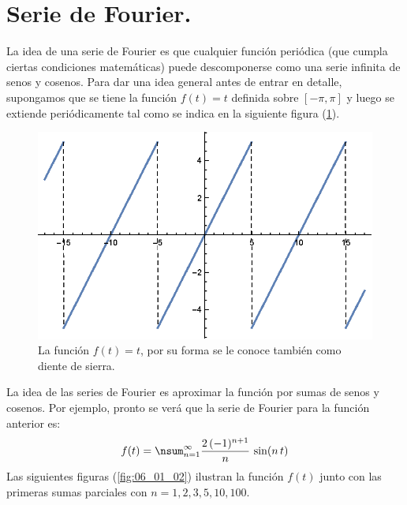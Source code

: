 \section{Serie de Fourier.}

La idea de una serie de Fourier es que cualquier función periódica (que cumpla ciertas condiciones matemáticas) puede descomponerse como una serie infinita de senos y cosenos. Para dar una idea general antes de entrar en detalle, supongamos que se tiene la función $f(t) = t$ definida sobre $[-\pi, \pi]$  y luego se extiende periódicamente tal como se indica en la siguiente figura (\ref{fig:06_01_01}).
 \begin{figure}[H]
     \centering
     \includegraphics[scale=1]{Imagenes/Funciones_Ortogonales_01.eps}
     \caption{La función $f(t) = t$, por su forma se le conoce también como diente de sierra.}
     \label{fig:06_01_01}
 \end{figure}
 La idea de las series de Fourier es aproximar la función por sumas de senos y cosenos. Por ejemplo, pronto se verá que la serie de Fourier para la función anterior es:
 \begin{align}
f(t) = \nsum_{n=1}^{\infty} \dfrac{2 \, (-1)^{n+1}}{n} \, \sin (n \, t)
\label{eq:ecuacion_01_06_26}
 \end{align}
Las siguientes figuras (\ref{fig:06_01_02}) ilustran la función $f(t)$ junto con las primeras sumas parciales con $ n = 1, 2, 3, 5, 10, 100$.

